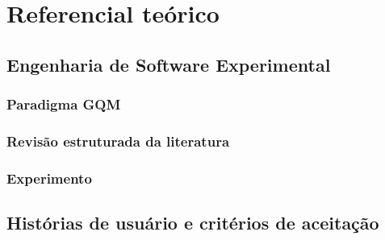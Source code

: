 \chapter[Referencial teórico]{Referencial teórico}
\label{cap:referencial}

%

\section{Engenharia de Software Experimental}
\label{sec:es-experimental}

\subsection{Paradigma GQM}
\label{sec:ref-gqm}

\subsection{Revisão estruturada da literatura}
\label{sec:ref-rsl}

\subsection{Experimento}
\label{sec:ref-experimento}

\section{Histórias de usuário e critérios de aceitação}
\label{sec:hu-ca}

